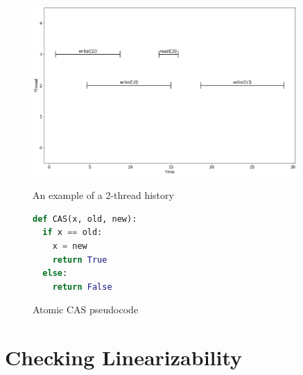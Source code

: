 \documentclass[oneside, a4paper, onecolumn, 10pt]{article}
\begin{document}
\begin{figure}
  \centering
  \begin{minipage}{0.65\textwidth}
      \centering
      \includegraphics[width=0.9\textwidth]{assets/io_spec_simple.png} 
      \caption{\label{Simple IO history}An example of a 2-thread history}
  \end{minipage}\hfill
  \begin{minipage}{0.3\textwidth}
      \centering
      \begin{lstlisting}[language=Python]
def CAS(x, old, new):
  if x == old:
    x = new
    return True
  else:
    return False
       \end{lstlisting} 
      \caption{\label{Atomic CAS} Atomic CAS pseudocode}
  \end{minipage}
\end{figure}

\section{Checking Linearizability}
\end{document}
